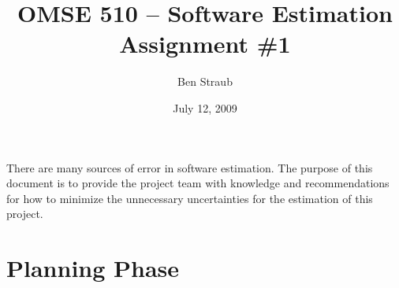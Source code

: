 \documentclass[11pt]{article}
\newif\ifblockcomment
\begin{document}
\ifblockcomment
You are working with a development team on a large software project.  The project is creating a web
based three-dimensional modeling tool.  This system will allow registered users to create and
manipulate three-dimensional objects via a web browser.  Because this is a project with a great deal
of high-level (shareholder) interest, the team has been instructed to provide estimates for the
project at each stage of the software development life cycle.

Your job is not to help the team estimate the project but to help the team minimize the factors that
add to the uncertainty of their estimates at each stage of the project.  So for each stage of the
software development life cycle (you may assume a waterfall type life cycle), describe the factors
that you think will contribute to the uncertainty of the team’s estimate and why the factor impacts
the reliability of the estimate.  Then describe what the team can do to minimize the effect of the
given factors.  If there is no way to minimize the effect of a factor, explain why that is the case.

Please submit your recommendations to the team in a Word document via Blackboard’s assignment
mechanism.

Please contact Chris Gilmore (via email or Blackboard) for any questions you may have about the
assignment.
\fi

\title{OMSE 510 -- Software Estimation\\Assignment \#1}
\author{Ben Straub}
\date{July 12, 2009}
\maketitle


There are many sources of error in software estimation.  The purpose of this document is to provide
the project team with knowledge and recommendations for how to minimize the unnecessary
uncertainties for the estimation of this project.


\section{Planning Phase}
\end{document}
